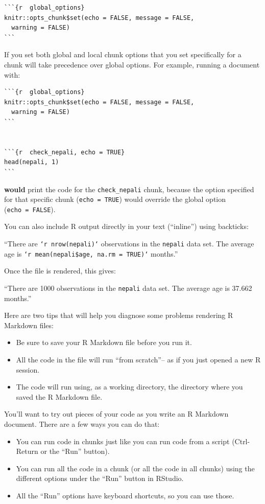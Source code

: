 \documentclass[]{book}
\providecommand{\tightlist}{%
  \setlength{\itemsep}{0pt}\setlength{\parskip}{0pt}}
\begin{document}
\begin{verbatim}
```{r  global_options}
knitr::opts_chunk$set(echo = FALSE, message = FALSE,
  warning = FALSE)
```
\end{verbatim}

If you set both global and local chunk options that you set specifically
for a chunk will take precedence over global options. For example,
running a document with:

\begin{verbatim}
```{r  global_options}
knitr::opts_chunk$set(echo = FALSE, message = FALSE,
  warning = FALSE)
```


```{r  check_nepali, echo = TRUE}
head(nepali, 1)
```
\end{verbatim}

\textbf{would} print the code for the \texttt{check\_nepali} chunk,
because the option specified for that specific chunk
(\texttt{echo\ =\ TRUE}) would override the global option
(\texttt{echo\ =\ FALSE}).

You can also include R output directly in your text (``inline'') using
backticks: \bigskip

``There are \texttt{`r\ nrow(nepali)`} observations in the
\texttt{nepali} data set. The average age is
\texttt{`r\ mean(nepali\$age,\ na.rm\ =\ TRUE)`} months.''

\bigskip

Once the file is rendered, this gives: \bigskip

``There are 1000 observations in the \texttt{nepali} data set. The
average age is 37.662 months.''

\bigskip

Here are two tips that will help you diagnose some problems rendering R
Markdown files:

\begin{itemize}
\tightlist
\item
  Be sure to save your R Markdown file before you run it.
\item
  All the code in the file will run ``from scratch''-- as if you just
  opened a new R session.
\item
  The code will run using, as a working directory, the directory where
  you saved the R Markdown file.
\end{itemize}

You'll want to try out pieces of your code as you write an R Markdown
document. There are a few ways you can do that:

\begin{itemize}
\tightlist
\item
  You can run code in chunks just like you can run code from a script
  (Ctrl-Return or the ``Run'' button).
\item
  You can run all the code in a chunk (or all the code in all chunks)
  using the different options under the ``Run'' button in RStudio.
\item
  All the ``Run'' options have keyboard shortcuts, so you can use those.
\end{itemize}
\end{document}
